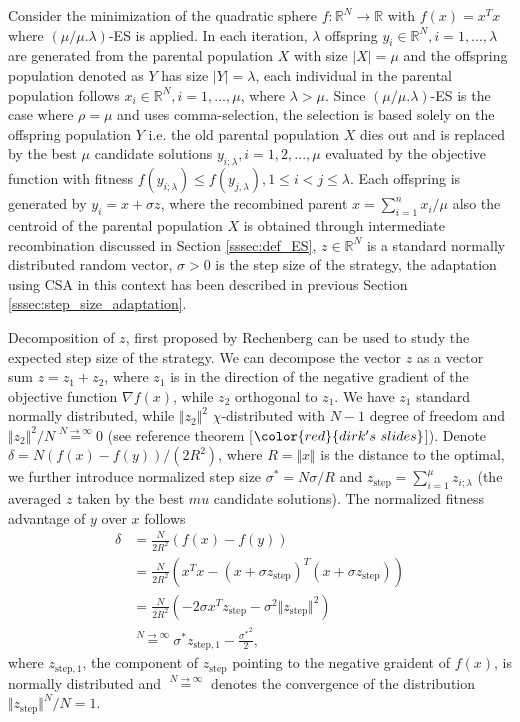 Consider the minimization of the quadratic sphere $f: \mathbb R^N \rightarrow \mathbb R$ with $f(x)=x^Tx$ where $(\mu/\mu.\lambda)$-ES is applied. In each iteration, $\lambda$ offspring $y_i \in \mathbb{R}^N,i = 1,...,\lambda $ are generated from the parental population $X$ with size $ \left| X \right| = \mu$ and the offspring population denoted as $Y$ has size $\left| Y \right| =\lambda$, each individual in the parental population follows $x_i \in \mathbb{R}^N, i=1,...,\mu$, where $\lambda>\mu$. Since $(\mu/\mu.\lambda)$-ES is the case where $\rho = \mu$ and uses comma-selection, the selection is based solely on the offspring population $Y$ i.e. the old parental population $X$ dies out and is replaced by the best $\mu$ candidate solutions $y_{i;\lambda},i = 1,2,...,\mu$ evaluated by the objective function with fitness $f(y_{i;\lambda}) \leq f(y_{j,\lambda}), 1 \leq i < j \leq \lambda$. Each  offspring is generated by $y_i = x + \sigma z$, where the recombined parent $x = \sum_{i=1}^n x_i/\mu$ also the centroid of the parental population $X$ is obtained through intermediate recombination discussed in Section \ref{sssec:def_ES}, $z \in  \mathbb R^N$ is a standard normally distributed random vector, $\sigma > 0$ is the step size of the strategy, the adaptation using CSA in this context has been described in previous Section \ref{sssec:step_size_adaptation}. 

Decomposition of $z$, first proposed by Rechenberg \cite{rechenberg1973evolutionsstrategie} can be used to study the expected step size of the strategy. We can decompose the vector $z$ as a vector sum $z = z_1 + z_2$, where $z_1$ is in the direction of the negative gradient of the objective function $\nabla f(x)$, while $z_2$ orthogonal to $z_1$. We have $z_1$ standard normally distributed, while $\Vert z_2\Vert^2$ $\chi$-distributed with $N-1$ degree of freedom and $ \Vert z_2\Vert^2 /N \overset{N \rightarrow \infty }{=} 0$ (see reference theorem [$\color{red}{dirk's\ slides }$]). Denote $\delta = N (f(x) - f(y))/(2R^2)$, where $R = \Vert x \Vert$ is the distance to the optimal, we further introduce normalized step size $\sigma^* = N \sigma/R$ and $z_{\text{step}} = \sum_{i=1}^\mu z_{i;\lambda}$ (the averaged $z$ taken by the best $mu$ candidate solutions). The normalized fitness advantage of $y$ over $x$ follows
\begin{align}{}
\delta & = \frac{N}{2R^2}\left( f(x) - f(y)\right)  \nonumber\\
& = \frac{N}{2R^2} (x^Tx - (x+\sigma z_{\text{step}})^T (x+\sigma z_{\text{step}})) \nonumber\\
& = \frac{N}{2R^2} (-2 \sigma x^Tz_{\text{step}} - \sigma^2 \Vert z_{\text{step}}\Vert^2 ) \nonumber\\
& \overset{N \rightarrow \infty}{=} \sigma^* z_{\text{step},1} - \frac{{\sigma^*} ^2}{2} \label{eqn:delta}{},
\end{align}
where $z_{\text{step},1} $, the component of $z_{\text{step}}$ pointing to the negative graident of $f(x)$, is normally distributed and $\overset{ N \rightarrow \infty}{=}$ denotes the convergence of the distribution $\Vert z_{\text{step} } \Vert^N/N = 1$. 

